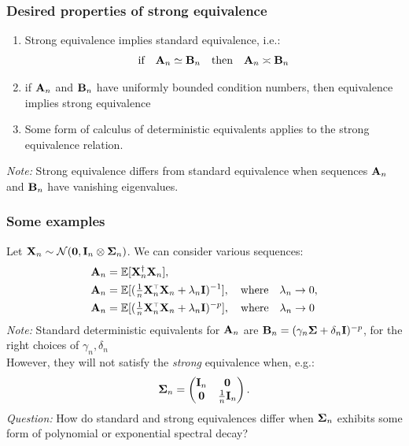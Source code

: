 \documentclass[10pt]{beamer}
\begin{document}
\begin{frame}
  \frametitle{Desired properties of strong equivalence}
  \begin{enumerate}
  \item Strong equivalence implies standard equivalence, i.e.:
    \begin{align*}
      \text{if}\quad \mathbf A_n\simeq\mathbf B_n \quad\text{then}\quad
      \mathbf A_n\asymp\mathbf B_n
      \end{align*}
  \item if $\mathbf A_n$ and $\mathbf B_n$ have uniformly bounded condition numbers,
    then equivalence implies strong equivalence\\[3mm]
  \item Some form of calculus of deterministic equivalents applies to
    the strong equivalence relation.
  \end{enumerate}
  \vspace{3mm}
  
  \emph{Note:} Strong equivalence differs from standard equivalence
  when sequences $\mathbf A_n$ and $\mathbf B_n$ have vanishing eigenvalues.
\end{frame}

\begin{frame}
  \frametitle{Some examples}

Let $\mathbf X_n\sim\mathcal{N}(\mathbf 0,\mathbf I_n\otimes\mathbf{\Sigma}_n)$. We can consider various sequences:
\begin{align*}
  \A_n &= \E[\X_n^\dagger\X_n],\\
  \A_n &= \E[(\tfrac1n\X_n^\top\X_n + \lambda_n\I)^{-1}],\quad\text{where}\quad
  \lambda_n\rightarrow 0,\\
  \A_n &= \E[(\tfrac1n\X_n^\top\X_n + \lambda_n\I)^{-p}],\quad\text{where}\quad
  \lambda_n\rightarrow 0
\end{align*}
\emph{Note:} Standard deterministic equivalents for $\mathbf A_n$ are $\mathbf B_n=(\gamma_n\mathbf{\Sigma} + \delta_n\mathbf I)^{-p}$, for the right choices
of $\gamma_n,\delta_n$\\[3mm]

However, they will not satisfy the \emph{strong} equivalence when, e.g.:
\begin{align*}
  \mathbf{\Sigma}_n =
  \begin{pmatrix}
    \mathbf I_n&\mathbf 0\\
    \mathbf 0 & \frac1n\mathbf I_n
  \end{pmatrix}.
\end{align*}
\emph{Question:} How do standard and strong equivalences differ when
$\mathbf{\Sigma}_n$ exhibits some form of polynomial or exponential spectral decay?

\end{frame}
\end{document}
